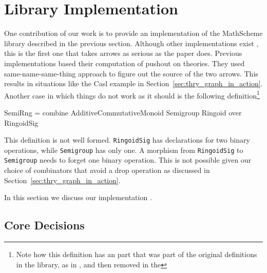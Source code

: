 \section{Library Implementation}
\label{sec:lib_implementation}
One contribution of our work is to provide an implementation of the MathScheme library described in the previous section. Although other implementations exist , this is the first one that takes arrows as serious as the paper does. Previous implementations based their computation of pushout on theories. They used same-name-same-thing approach to figure out the source of the two arrows. This results in situations like the Casl example in Section~\ref{sec:thry_graph_in_action}. Another case in which things do not work as it should is the following definition\footnote{Note how this definition has an  part that was part of the original definitions in the library, as in \cite{CaretteOConnorTPC}, and then removed in the }
\begin{togcode}
SemiRng = combine AdditiveCommutativeMonoid Semigroup Ringoid
          over RingoidSig
\end{togcode}
This definition is not well formed. \verb|RingoidSig| has declarations for two binary operations, while \verb|Semigroup| has only one. A morphism from \verb|RingoidSig| to \verb|Semigroup| needs to forget one binary operation. This is not possible given our choice of combinators that avoid a drop operation as discussed in Section~\ref{sec:thry_graph_in_action}. 

In this section we discuss our implementation . 

\subsection{Core Decisions}

